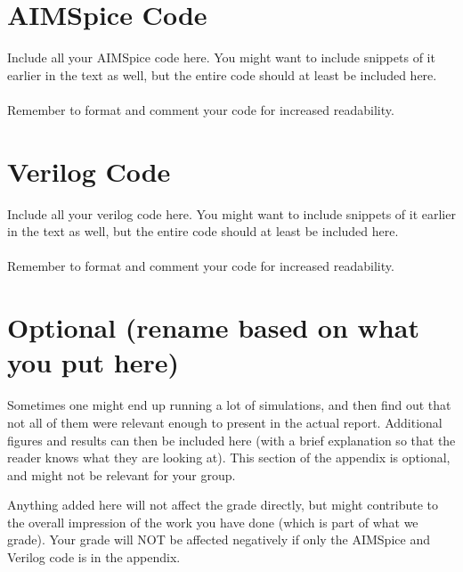 \appendix
\section{AIMSpice Code}
Include all your AIMSpice code here. You might want to include snippets of it earlier in the text as well, but the entire code should at least be included here.
\\ \\
Remember to format and comment your code for increased readability.

\section{Verilog Code}
Include all your verilog code here. You might want to include snippets of it earlier in the text as well, but the entire code should at least be included here.
\\ \\
Remember to format and comment your code for increased readability.


\section{Optional (rename based on what you put here)}
Sometimes one might end up running a lot of simulations, and then find out that not all of them were relevant enough to present in the actual report. Additional figures and results can then be included here (with a brief explanation so that the reader knows what they are looking at). This section of the appendix is optional, and might not be relevant for your group. 

Anything added here will not affect the grade directly, but might contribute to the overall impression of the work you have done (which is part of what we grade). Your grade will NOT be affected negatively if only the AIMSpice and Verilog code is in the appendix.